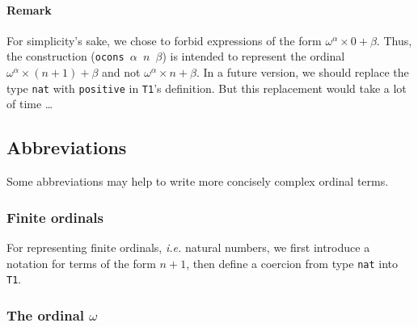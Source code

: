 \paragraph{Remark}
For simplicity's sake, we chose to forbid  expressions of the form $\omega^\alpha\times 0 + \beta$. Thus, the construction (\texttt{ocons $\alpha$ $n$ $\beta$}) is intended to represent the
ordinal $\omega^\alpha\times(n+1)+\beta$ and not $\omega^\alpha\times n+\beta$.
In a future version, we should replace  the type \texttt{nat} with \texttt{positive} in \texttt{T1}'s 
definition. But this replacement would take a lot of time \dots{}

\subsection{Abbreviations}

Some abbreviations may help to write more concisely complex ordinal terms.

\subsubsection{Finite ordinals}
\label{sec:orgheadline67}

For representing finite ordinals, \emph{i.e.} natural numbers, we first introduce a notation for terms of the form $n+1$, then define a coercion from type \texttt{nat} into \texttt{T1}.
\label{sect:notation-FS}

\label{sect:notation-F}





\subsubsection{The ordinal \(\omega\)}
\label{sec:orgheadline68}


